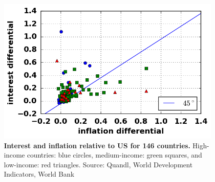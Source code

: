 \begin{figure}[h]
\caption{\label{fig_inflationInterestDifferentialsOpen} \textbf{Interest and inflation relative to US for 146 countries.} High-income countries: blue circles, medium-income: green squares, and low-income: red triangles. {\tiny Source: Quandl, World Development Indicators, World Bank}}
\hspace*{-.5cm}\includegraphics[height = 7.cm]{./png/fig_inflationInterestDifferentialsOpen.png}
\end{figure}